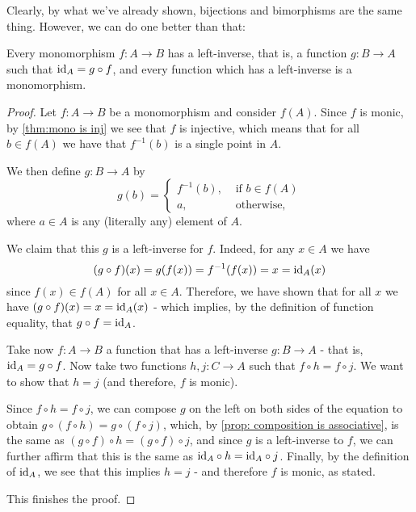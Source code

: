 Clearly, by what we've already shown, bijections and bimorphisms are the same thing. However, we can do one better than that:

\begin{lemma}\label{lem: mono left-inverse}
	Every monomorphism $f:A\to B$ has a left-inverse, that is, a function $g:B\to A$ such that ${\rm id}_A=g\circ f$, and every function which has a left-inverse is a monomorphism.
\end{lemma}
\begin{proof}
	Let $f:A\to B$ be a monomorphism and consider $f(A)$. Since $f$ is monic, by \cref{thm:mono is inj} we see that $f$ is injective, which means that for all $b\in f(A)$ we have that $f^{-1}(b)$ is a single point in $A$.
	
	We then define $g:B\to A$ by
	$$g(b)=\begin{cases}
	f^{-1}(b),&\mbox{ if }b\in f(A)\\
	a,&\mbox{ otherwise,}
	\end{cases}$$where $a\in A$ is any (literally any) element of $A$.
	
	We claim that this $g$ is a left-inverse for $f$. Indeed, for any $x\in A$ we have
	\[(g\circ f)(x)=g(f(x))=f^{-1}(f(x))=x={\rm id}_A(x)\]since $f(x)\in f(A)$ for all $x\in A$. Therefore, we have shown that for all $x$ we have $(g\circ f)(x)=x={\rm id}_A(x)$ - which implies, by the definition of function equality, that $g\circ f={\rm id}_A$.
	
	\bigskip
	Take now $f:A\to B$ a function that has a left-inverse $g:B\to A$ - that is, ${\rm id}_A=g\circ f$. Now take two functions $h,j:C\to A$ such that $f\circ h=f\circ j$. We want to show that $h=j$ (and therefore, $f$ is monic).
	
	Since $f\circ h=f\circ j$, we can compose $g$ on the left on both sides of the equation to obtain $g\circ (f\circ h)=g\circ(f\circ j)$, which, by \cref{prop: composition is associative}, is the same as $(g\circ f)\circ h=(g\circ f)\circ j$, and since $g$ is a left-inverse to $f$, we can further affirm that this is the same as ${\rm id}_A\circ h={\rm id}_A\circ j$. Finally, by the definition of ${\rm id}_A$, we see that this implies $h=j$ - and therefore $f$ is monic, as stated.
	
	This finishes the proof.
\end{proof}

